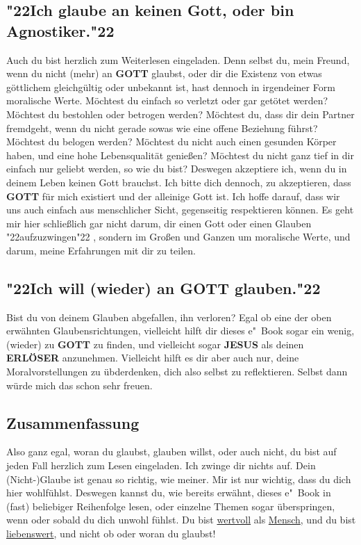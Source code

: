 \documentclass[10pt,a5paper]{article}
\newcommand{\Erloeser}[0]{\textbf{ERL\"OSER}}
\newcommand{\Gott}[0]{\textbf{GOTT}}
\newcommand{\Jesus}[0]{\textbf{JESUS}}
\newcommand{\q}[1]{\char"22{#1}\char"22 }
\begin{document}
	\subsection{\q{Ich glaube an keinen Gott, oder bin Agnostiker.}}
		Auch du bist herzlich zum Weiterlesen eingeladen.
		Denn selbst du,
		mein Freund,
		wenn du nicht (mehr) an {\Gott} glaubst,
		oder dir die Existenz von etwas g\"ottlichem gleichg\"ultig oder unbekannt ist,
		hast dennoch in irgendeiner Form moralische Werte.
		M\"ochtest du einfach so verletzt oder gar get\"otet werden?
		M\"ochtest du bestohlen oder betrogen werden?
		M\"ochtest du,
		dass dir dein Partner fremdgeht,
		wenn du nicht gerade sowas wie eine offene Beziehung f\"uhrst?
		M\"ochtest du belogen werden?
		M\"ochtest du nicht auch einen gesunden K\"orper haben,
		und eine hohe Lebensqualit\"at genie{\ss}en?
		M\"ochtest du nicht ganz tief in dir einfach nur geliebt werden,
		so wie du bist?
		Deswegen akzeptiere ich,
		wenn du in deinem Leben keinen Gott brauchst.
		Ich bitte dich dennoch,
		zu akzeptieren,
		dass {\Gott} f\"ur mich existiert und der alleinige Gott ist.
		Ich hoffe darauf,
		dass wir uns auch einfach aus menschlicher Sicht,
		gegenseitig respektieren k\"onnen.
		Es geht mir hier schlie{\ss}lich gar nicht darum,
		dir einen Gott oder einen Glauben \q{aufzuzwingen},
		sondern im Gro{\ss}en und Ganzen um moralische Werte,
		und darum,
		meine Erfahrungen mit dir zu teilen.

	\subsection{\q{Ich will (wieder) an {\Gott} glauben.}}
		Bist du von deinem Glauben abgefallen, ihn verloren?
		Egal ob eine der oben erw\"ahnten Glaubensrichtungen,
		vielleicht hilft dir dieses e"~Book sogar ein wenig,
		(wieder) zu {\Gott} zu finden,
		und vielleicht sogar {\Jesus} als deinen {\Erloeser} anzunehmen.
		Vielleicht hilft es dir aber auch nur,
		deine Moralvorstellungen zu \"ubderdenken,
		dich also selbst zu reflektieren.
		Selbst dann w\"urde mich das schon sehr freuen.
		
	\subsection{Zusammenfassung}
		Also ganz egal,
		woran du glaubst,
		glauben willst,
		oder auch nicht,
		du bist auf jeden Fall herzlich zum Lesen eingeladen.
		Ich zwinge dir nichts auf.
		Dein (Nicht-)Glaube ist genau so richtig,
		wie meiner.
		Mir ist nur wichtig,
		dass du dich hier wohlf\"uhlst.
		Deswegen kannst du,
		wie bereits erw\"ahnt,
		dieses e"~Book in (fast) beliebiger Reihenfolge lesen,
		oder einzelne Themen sogar \"uberspringen,
		wenn oder sobald du dich unwohl f\"uhlst.
		Du bist \underline{wertvoll} als \underline{Mensch},
		und du bist \underline{liebenswert},
		und nicht ob oder woran du glaubst!
\end{document}
